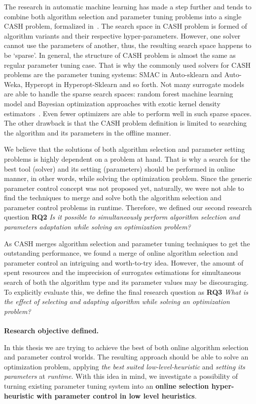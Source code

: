The research in automatic machine learning has made a step further and tends to combine both algorithm selection and parameter tuning problems into a single CASH problem, formalized in~\cite{thornton2013auto}. The search space in CASH problem is formed of algorithm variants and their respective hyper-parameters. However, one solver cannot use the parameters of another, thus, the resulting search space happens to be `sparse'. In general, the structure of CASH problem is almost the same as regular parameter tuning case. That is why the commonly used solvers for CASH problems are the parameter tuning systems: SMAC in Auto-sklearn and Auto-Weka, Hyperopt in Hyperopt-Sklearn and so forth.
Not many surrogate models are able to handle the sparse search spaces: random forest machine learning model and Bayesian optimization approaches with exotic kernel density estimators~\cite{levesque2017bayesian}. Even fewer optimizers are able to perform well in such sparse spaces.
The other drawback is that the CASH problem definition is limited to searching the algorithm and its parameters in the offline manner.

We believe that the solutions of both algorithm selection and parameter setting problems is highly dependent on a problem at hand.
That is why a search for the best tool (solver) and its setting (parameters) should be performed in online manner, in other words, while solving the optimization problem. Since the generic parameter control concept was not proposed yet, naturally, we were not able to find the techniques to merge and solve both the algorithm selection and parameter control problems in runtime. Therefore, we defined our second research question \textbf{RQ2} \emph{Is it possible to simultaneously perform algorithm selection and parameters adaptation while solving an optimization problem?}

As CASH merges algorithm selection and parameter tuning techniques to get the outstanding performance, we found a merge of online algorithm selection and parameter control an intriguing and worth-to-try idea. However, the amount of spent resources and the imprecision of surrogates estimations for simultaneous search of both the algorithm type and its parameter values may be discouraging. To explicitly evaluate this, we define the final research question as \textbf{RQ3} \emph{What is the effect of selecting and adapting algorithm while solving an optimization problem?}

\paragraph{}
\textbf{Research objective defined.}

In this thesis we are trying to achieve the best of both online algorithm selection and parameter control worlds. The resulting approach should be able to solve an optimization problem, applying \emph{the best suited low-level-heuristic} and \emph{setting its parameters} at \emph{runtime}. With this idea in mind, we investigate a possibility of turning existing parameter tuning system into an \textbf{online selection hyper-heuristic with parameter control in low level heuristics}.
